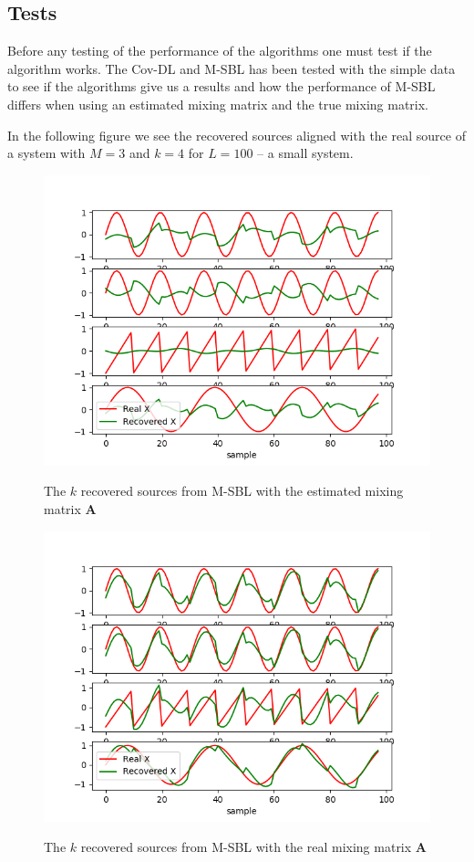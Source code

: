 \subsection{Tests}
Before any testing of the performance of the algorithms one must test if the algorithm works. The Cov-DL and M-SBL has been tested with the simple data to see if the algorithms give us a results and how the performance of M-SBL differs when using an estimated mixing matrix and the true mixing matrix.

In the following figure we see the recovered sources aligned with the real source of a system with $M = 3$ and $k = 4$ for $L = 100$ -- a small system.
\begin{figure}[H]
\centering
    \begin{minipage}[t]{.45\textwidth}
        \centering
        \includegraphics[scale=0.5]{figures/chapter6/test_of_algo_mix_data.png}
\label{fig:test_toy}
\caption{The $k$ recovered sources from M-SBL with the estimated mixing matrix $\mathbf{A}$}
    \end{minipage} 
    \hfill
    \begin{minipage}[t]{.45\textwidth}
        \centering
        \includegraphics[scale=0.5]{figures/chapter6/test_of_algo_mix_data_realA.png}
\label{fig:test_toy_realA}
\caption{The $k$ recovered sources from M-SBL with the real mixing matrix $\mathbf{A}$}
    \end{minipage}
\end{figure}
